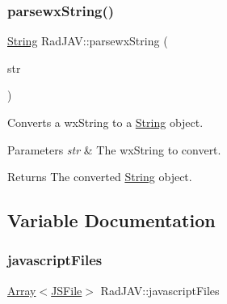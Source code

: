 \mbox{\label{namespace_rad_j_a_v_a6c77eaa06c1cacff5e3eca5569e587a3}} 
\subsubsection{\texorpdfstring{parsewx\+String()}{parsewxString()}}
{\footnotesize\ttfamily \mbox{\hyperlink{class_rad_j_a_v_1_1_string}{String}} Rad\+J\+A\+V\+::parsewx\+String (\begin{DoxyParamCaption}\item[{wx\+String}]{str }\end{DoxyParamCaption})}

Converts a wx\+String to a \mbox{\hyperlink{class_rad_j_a_v_1_1_string}{String}} object. 
\begin{DoxyParams}{Parameters}
{\em str} & The wx\+String to convert. \\
\hline
\end{DoxyParams}
\begin{DoxyReturn}{Returns}
The converted \mbox{\hyperlink{class_rad_j_a_v_1_1_string}{String}} object. 
\end{DoxyReturn}


\subsection{Variable Documentation}
\mbox{\label{namespace_rad_j_a_v_ad238af21ba8714838d7368dfc40c1112}} 
\subsubsection{\texorpdfstring{javascript\+Files}{javascriptFiles}}
{\footnotesize\ttfamily \mbox{\hyperlink{class_rad_j_a_v_1_1_array}{Array}}$<$\mbox{\hyperlink{class_rad_j_a_v_1_1_j_s_file}{J\+S\+File}}$>$ Rad\+J\+A\+V\+::javascript\+Files}

